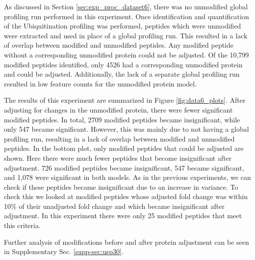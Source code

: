\documentclass[mcp]{article}
\numberwithin{table}{section}
\begin{document}
As discussed in Section \ref{sec:exp_proc_dataset6}, there was no unmodified global profiling run performed in this experiment. Once identification and quantification of the Ubiquitination profiling was performed, peptides which were unmodified were extracted and used in place of a global profiling run. This resulted in a lack of overlap between modified and unmodified peptides. Any modified peptide without a corresponding unmodified protein could not be adjusted. Of the 10,799 modified peptides identified, only 4526 had a corresponding unmodified protein and could be adjusted. Additionally, the lack of a separate global profiling run resulted in low feature counts for the unmodified protein model.

The results of this experiment are summarized in Figure \ref{fig:data6_plots}. After adjusting for changes in the unmodified protein, there were fewer significant modified peptides. In total, 2709 modified peptides became insignificant, while only 547 became significant. However, this was mainly due to not having a global profiling run, resulting in a lack of overlap between modified and unmodified peptides. In the bottom plot, only modified peptides that could be adjusted are shown. Here there were much fewer peptides that become insignificant after adjustment. 726 modified peptides became insignificant, 547 became significant, and 1,078 were significant in both models. As in the previous experiments, we can check if these peptides became insignificant due to an increase in variance. To check this we looked at modified peptides whose adjusted fold change was within 10\% of their unadjusted fold change and which became insignificant after adjustment. In this experiment there were only 25 modified peptides that meet this criteria.

Further analysis of modifications before and after protein adjustment can be seen in Supplementary Sec. \ref{supp-sec:usp30}.

\end{document}
